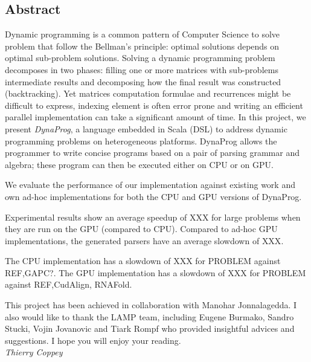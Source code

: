 

% 


\subsection*{Abstract}
Dynamic programming is a common pattern of Computer Science to solve problem that follow the Bellman's principle: optimal solutions depends on optimal sub-problem solutions. Solving a dynamic programming problem decomposes in two phases: filling one or more matrices with sub-problems intermediate results and decomposing how the final result was constructed (backtracking). Yet matrices computation formulae and recurrences might be difficult to express, indexing element is often error prone and writing an efficient parallel implementation can take a significant amount of time. In this project, we present \textit{DynaProg}, a language embedded in Scala (DSL) to address dynamic programming problems on heterogeneous platforms. DynaProg allows the programmer to write concise programs based on a pair of parsing grammar and algebra; these program can then be executed either on CPU or on GPU.

We evaluate the performance of our implementation against existing work and own ad-hoc implementations for both the CPU and GPU versions of DynaProg.

Experimental results show an average speedup of {\color{red} XXX} for large problems when they are run on the GPU (compared to CPU). Compared to ad-hoc GPU implementations, the generated parsers have an average slowdown of {\color{red} XXX}.

The CPU implementation has a slowdown of {\color{red} XXX} for {\color{red} PROBLEM} against {\color{red} REF,GAPC?}.
The GPU implementation has a slowdown of {\color{red} XXX} for {\color{red} PROBLEM} against {\color{red} REF,CudAlign, RNAFold}.
 
\vfill
This project has been achieved in collaboration with Manohar Jonnalagedda. I also would like to thank the LAMP team, including Eugene Burmako, Sandro Stucki, Vojin Jovanovic and Tiark Rompf who provided insightful advices and suggestions. I hope you will enjoy your reading. \vspace{.3cm}\\
\textit{Thierry Coppey}

